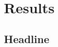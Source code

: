 \documentclass[12pt,a4paper,oneside]{article}
\begin{document}
\newpage
\section{Results}\label{sec:results}



\subsection{Headline}\label{subsec:results_headline}

%
%
\end{document}

